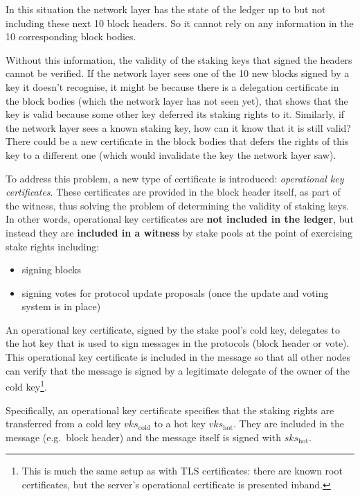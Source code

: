 \documentclass[11pt,a4paper,dvipsnames,twosided]{article}
\begin{document}
In this situation the network layer has the state of the ledger up to
but not including these next 10 block headers. So it cannot rely on
any information in the 10 corresponding block bodies.

Without this information, the validity of the staking keys that signed
the headers cannot be verified. If the network layer sees one of the
10 new blocks signed by a key it doesn't recognise, it might be
because there is a delegation certificate in the block bodies (which
the network layer has not seen yet), that shows that the key is valid
because some other key deferred its staking rights to it. Similarly,
if the network layer sees a known staking key, how can it know that it
is still valid? There could be a new certificate in the block bodies
that defers the rights of this key to a different one (which would
invalidate the key the network layer saw).

To address this problem, a new type of certificate is introduced:
\emph{operational key certificates}. These certificates are provided
in the block header itself, as part of the witness, thus solving the
problem of determining the validity of staking keys. In other words,
operational key certificates are \textbf{not included in
  the ledger}, but instead they are \textbf{included in a witness} by
stake pools at the point of exercising stake rights including:

\begin{itemize}
\item
  signing blocks
\item signing votes for protocol update proposals (once the update and
  voting system is in place)
\end{itemize}

An operational key certificate, signed by the stake pool's cold key,
delegates to the hot key that is used to sign messages in the
protocols (block header or vote). This operational key certificate is
included in the message so that all other nodes can verify that the
message is signed by a legitimate delegate of the owner of the cold
key\footnote{This is much the same setup as with TLS certificates:
  there are known root certificates, but the server's operational
  certificate is presented inband.}.

Specifically, an operational key certificate specifies that the
staking rights are transferred from a cold key \(vks_\text{cold}\)
to a hot key \(vks_\text{hot}\).
They are included in the message (e.g.~block header) and the message
itself is signed with \(sks_\text{hot}\).
\end{document}
